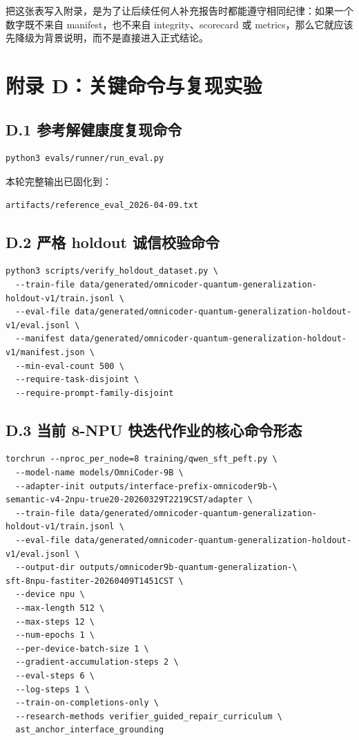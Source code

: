 \documentclass[11pt,a4paper]{article}
\begin{document}
把这张表写入附录，是为了让后续任何人补充报告时都能遵守相同纪律：如果一个数字既不来自 manifest，也不来自 integrity、scorecard 或 metrics，那么它就应该先降级为背景说明，而不是直接进入正式结论。

\clearpage

\section{附录 D：关键命令与复现实验}

\subsection{D.1 参考解健康度复现命令}

\begin{verbatim}
python3 evals/runner/run_eval.py
\end{verbatim}

本轮完整输出已固化到：
\begin{verbatim}
artifacts/reference_eval_2026-04-09.txt
\end{verbatim}

\subsection{D.2 严格 holdout 诚信校验命令}

\begin{verbatim}
python3 scripts/verify_holdout_dataset.py \
  --train-file data/generated/omnicoder-quantum-generalization-holdout-v1/train.jsonl \
  --eval-file data/generated/omnicoder-quantum-generalization-holdout-v1/eval.jsonl \
  --manifest data/generated/omnicoder-quantum-generalization-holdout-v1/manifest.json \
  --min-eval-count 500 \
  --require-task-disjoint \
  --require-prompt-family-disjoint
\end{verbatim}

\subsection{D.3 当前 8-NPU 快迭代作业的核心命令形态}

\begin{verbatim}
torchrun --nproc_per_node=8 training/qwen_sft_peft.py \
  --model-name models/OmniCoder-9B \
  --adapter-init outputs/interface-prefix-omnicoder9b-\
semantic-v4-2npu-true20-20260329T2219CST/adapter \
  --train-file data/generated/omnicoder-quantum-generalization-holdout-v1/train.jsonl \
  --eval-file data/generated/omnicoder-quantum-generalization-holdout-v1/eval.jsonl \
  --output-dir outputs/omnicoder9b-quantum-generalization-\
sft-8npu-fastiter-20260409T1451CST \
  --device npu \
  --max-length 512 \
  --max-steps 12 \
  --num-epochs 1 \
  --per-device-batch-size 1 \
  --gradient-accumulation-steps 2 \
  --eval-steps 6 \
  --log-steps 1 \
  --train-on-completions-only \
  --research-methods verifier_guided_repair_curriculum \
  ast_anchor_interface_grounding
\end{verbatim}
\end{document}
